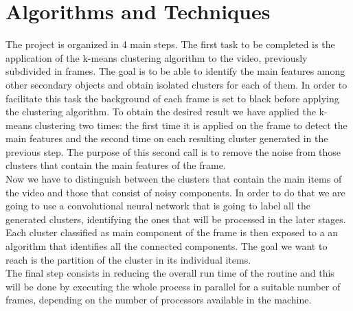 \documentclass{usiinftr}
\begin{document}
\section{Algorithms and Techniques}
The project is organized in 4 main steps. The first task to be completed is the application of the k-means clustering algorithm to the video, previously subdivided in frames. The goal is to be able to identify the main features among other secondary objects and obtain isolated clusters for each of them. In order to facilitate this task the background of each frame is set to black before applying the clustering algorithm. To obtain the desired result we have applied the k-means clustering two times: the first time it is applied on the frame to detect the main features and the second time on each resulting cluster generated in the previous step. The purpose of this second call is to remove the noise from those clusters that contain the main features of the frame. \\
Now we have to distinguish between the clusters that contain the main items of the video and those that consist of noisy components. In order to do that we are going to use a convolutional neural network that is going to label all the generated clusters, identifying the ones that will be processed in the later stages. \\
Each cluster classified as main component of the frame is then exposed to a an algorithm that identifies all the connected components. The goal we want to reach is the partition of the cluster in its individual items.  \\
The final step consists in reducing the overall run time of the routine and this will be done by executing the whole process in parallel for a suitable number of frames, depending on the number of processors available in the machine.
\end{document}
